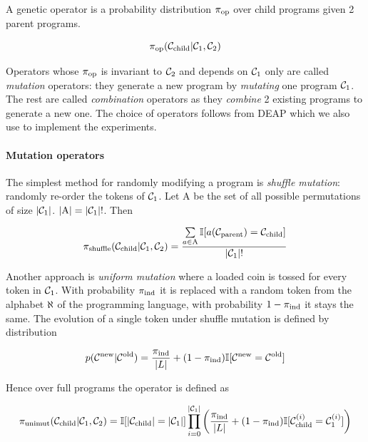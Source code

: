 A genetic operator is a probability distribution $\pi_\text{op}$ over child programs given 2 parent programs. 

\begin{equation}
    \pi_\text{op}(\mathcal{C}_\text{child}|\mathcal{C}_1,\mathcal{C}_2)
\end{equation}

Operators whose $\pi_\text{op}$ is invariant to $\mathcal{C}_2$ and depends on $\mathcal{C}_1$ only are called \emph{mutation} operators: they generate a new program by \emph{mutating} one program $\mathcal{C}_1$.
The rest are called \emph{combination} operators as they \emph{combine} 2 existing programs to generate a new one.
The choice of operators follows from DEAP \cite{deap, derainvilleDEAPEnablingNimbler2014, derainvilleDEAPPythonFramework2012} which we also use to implement the experiments.

\paragraph{Mutation operators}

The simplest method for randomly modifying a program is \emph{shuffle mutation}: randomly re-order the tokens of $\mathcal{C}_1$.
Let $\mathrm{A}$ be the set of all possible permutations of size $|\mathcal{C}_1|$. $|\mathrm{A}|=|\mathcal{C}_1|!$. 
Then

\begin{equation}
    \pi_\text{shuffle}(\mathcal{C}_\text{child}|\mathcal{C}_1,\mathcal{C}_2) =
            \frac{\sum\limits_{a \in \mathrm{A}} \mathbb{I}[a(\mathcal{C}_\text{parent}) = \mathcal{C}_\text{child}]}{|\mathcal{C}_1|!}
\end{equation}

Another approach is \emph{uniform mutation} where a loaded coin is tossed for every token in $\mathcal{C}_1$. 
With probability $\pi_\text{ind}$ it is replaced with a random token from the alphabet $\aleph$ of the programming language, with probability $1-\pi_\text{ind}$ it stays the same.
The evolution of a single token under shuffle mutation is defined by distribution

\begin{equation}
    p(\mathcal{C}^\text{new} | \mathcal{C}^\text{old}) = \frac{\pi_\text{ind}}{|L|} +  (1 - \pi_\text{ind}) \mathbb{I}[\mathcal{C}^\text{new} = \mathcal{C}^\text{old}]
\end{equation}

Hence over full programs the operator is defined as

\begin{equation}
    \pi_\text{unimut}(\mathcal{C}_\text{child}|\mathcal{C}_1,\mathcal{C}_2) = \mathbb{I}[|\mathcal{C}_\text{child}|=|\mathcal{C}_1|] \\ 
    \prod\limits_{i=0}^{|\mathcal{C}_1|}  \left(\frac{\pi_\text{ind}}{|L|} +  (1 - \pi_\text{ind}) \mathbb{I}[\mathcal{C}_\text{child}^{(i)} = \mathcal{C}_1^{(i)}] \right)
\end{equation}

